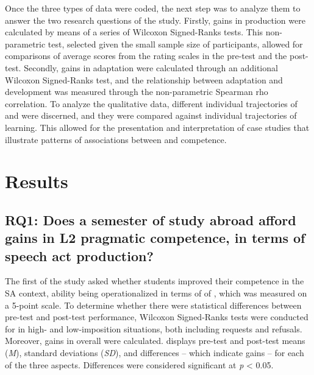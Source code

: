 \documentclass[output=paper]{langsci/langscibook}
\begin{document}
Once the three types of data were coded, the next step was to analyze them to answer the two research questions of the study. Firstly, gains in  production were calculated by means of a series of Wilcoxon Signed-Ranks tests. This non-parametric test, selected given the small sample size of participants, allowed for comparisons of average scores from the rating scales in the pre-test and the post-test. Secondly, gains in  adaptation were calculated through an additional Wilcoxon Signed-Ranks test, and the relationship between  adaptation and  development was measured through the non-parametric Spearman rho correlation. To analyze the qualitative data, different individual trajectories of  and  were discerned, and they were compared against individual trajectories of  learning. This allowed for the presentation and interpretation of case studies that illustrate patterns of associations between  and  competence.


\section{Results}
\largerpage

\subsection{RQ1: Does a semester of study abroad afford gains in L2 pragmatic competence, in terms of speech act production?}

The first  of the study asked whether students improved their  competence in the SA context,  ability being operationalized in terms of  of , which was measured on a 5-point scale. To determine whether there were statistical differences between pre-test and post-test  performance, Wilcoxon Signed-Ranks tests were conducted for  in high- and low-imposition situations, both including requests and refusals. Moreover, gains in overall  were calculated.  displays pre-test and post-test means (\textit{M}), standard deviations (\textit{SD}), and differences – which indicate gains – for each of the three aspects. Differences were considered significant at \textit{p} < 0.05.
\end{document}
